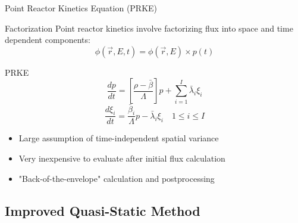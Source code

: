 \documentclass[8pt,xcolor=dvipnames]{beamer}
\newcommand{\be}{\begin{equation*}}
\newcommand{\ee}{\end{equation*}}
\newcommand{\vr}{\vec{r}}
\begin{document}
\begin{frame}{Point Reactor Kinetics Equation (PRKE)}

\begin{block}{Factorization}
Point reactor kinetics involve factorizing flux into space and time dependent components:
\be
\phi(\vr,E,t) = \phi(\vr,E)\times p(t)
\ee
\end{block}

\begin{block}{PRKE}
\[
\frac{dp}{dt}=\left[\frac{\rho-\bar{\beta}}{\Lambda}\right]p+\sum_{i=1}^I\bar{\lambda}_i\xi_i
\]
\[
\frac{d\xi_i}{dt}=\frac{\bar{\beta}_i}{\Lambda}p - \bar{\lambda}_i\xi_i \quad 1 \le i \le I 
\]
\end{block}

\begin{block}{}
\begin{itemize}
\item Large assumption of time-independent spatial variance
\item Very inexpensive to evaluate after initial flux calculation
\item "Back-of-the-envelope" calculation and postprocessing
\end{itemize}
\end{block}

\end{frame}

\subsection{Improved Quasi-Static Method}
\end{document}

